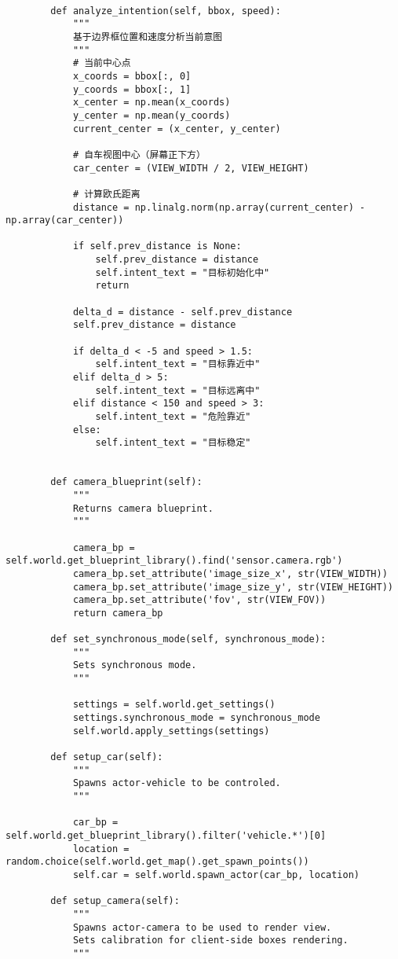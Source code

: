 \begin{lstlisting}
	
	    def analyze_intention(self, bbox, speed):
	        """
	        基于边界框位置和速度分析当前意图
	        """
	        # 当前中心点
	        x_coords = bbox[:, 0]
	        y_coords = bbox[:, 1]
	        x_center = np.mean(x_coords)
	        y_center = np.mean(y_coords)
	        current_center = (x_center, y_center)
	
	        # 自车视图中心（屏幕正下方）
	        car_center = (VIEW_WIDTH / 2, VIEW_HEIGHT)
	
	        # 计算欧氏距离
	        distance = np.linalg.norm(np.array(current_center) - np.array(car_center))
	
	        if self.prev_distance is None:
	            self.prev_distance = distance
	            self.intent_text = "目标初始化中"
	            return
	
	        delta_d = distance - self.prev_distance
	        self.prev_distance = distance
	
	        if delta_d < -5 and speed > 1.5:
	            self.intent_text = "目标靠近中"
	        elif delta_d > 5:
	            self.intent_text = "目标远离中"
	        elif distance < 150 and speed > 3:
	            self.intent_text = "危险靠近"
	        else:
	            self.intent_text = "目标稳定"
	
	
	    def camera_blueprint(self):
	        """
	        Returns camera blueprint.
	        """
	
	        camera_bp = self.world.get_blueprint_library().find('sensor.camera.rgb')
	        camera_bp.set_attribute('image_size_x', str(VIEW_WIDTH))
	        camera_bp.set_attribute('image_size_y', str(VIEW_HEIGHT))
	        camera_bp.set_attribute('fov', str(VIEW_FOV))
	        return camera_bp
	
	    def set_synchronous_mode(self, synchronous_mode):
	        """
	        Sets synchronous mode.
	        """
	
	        settings = self.world.get_settings()
	        settings.synchronous_mode = synchronous_mode
	        self.world.apply_settings(settings)
	
	    def setup_car(self):
	        """
	        Spawns actor-vehicle to be controled.
	        """
	
	        car_bp = self.world.get_blueprint_library().filter('vehicle.*')[0]
	        location = random.choice(self.world.get_map().get_spawn_points())
	        self.car = self.world.spawn_actor(car_bp, location)
	
	    def setup_camera(self):
	        """
	        Spawns actor-camera to be used to render view.
	        Sets calibration for client-side boxes rendering.
	        """
	

\end{lstlisting}
